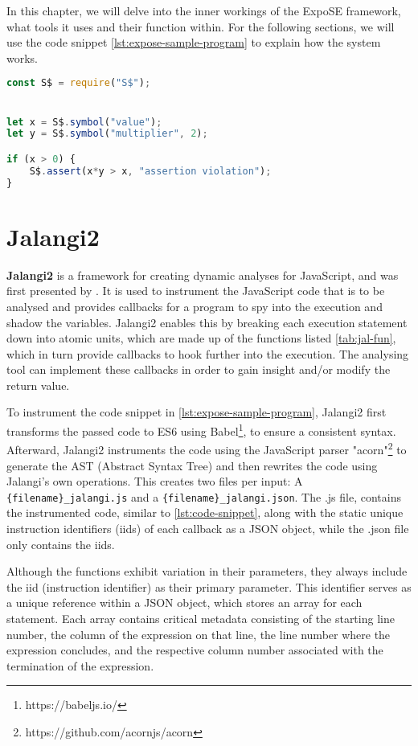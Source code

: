 \raggedbottom
In this chapter, we will delve into the inner workings of the ExpoSE framework, what tools it uses and their function within. 
For the following sections, we will use the code snippet \autoref{lst:expose-sample-program} to explain how the system works. 


\begin{lstlisting}[language=JavaScript,float, caption={A simple program for ExpoSE}, label={lst:expose-sample-program}]
const S$ = require("S$");


let x = S$.symbol("value"); 
let y = S$.symbol("multiplier", 2);

if (x > 0) {
    S$.assert(x*y > x, "assertion violation"); 
}


\end{lstlisting}




\section{Jalangi2}
\label{sec:jalangi}
\textbf{Jalangi2} \cite{noauthor_samsungjalangi2_nodate} is a framework for creating dynamic analyses for JavaScript, and was first presented by \citet{sen_jalangi_2013}. It is used to instrument the JavaScript code that is to be analysed and provides callbacks for a program to spy into the execution and shadow the variables.
Jalangi2 enables this by breaking each execution statement down into atomic units, which are made up of the functions listed \autoref{tab:jal-fun}, which in turn provide callbacks to hook further into the execution.
The analysing tool can implement these callbacks in order to gain insight and/or modify the return value.


To instrument the code snippet in \autoref{lst:expose-sample-program}, Jalangi2 first transforms the passed code to ES6 using Babel\footnote{https://babeljs.io/}, to ensure a consistent syntax. 
Afterward, Jalangi2 instruments the code using the JavaScript parser "acorn"\footnote{https://github.com/acornjs/acorn} to generate the AST (Abstract Syntax Tree) and then rewrites the code using Jalangi's own operations. This creates two files per input: 
A \lstinline+{filename}_jalangi.js+ and a \lstinline+{filename}_jalangi.json+. The .js file, contains the instrumented code, similar to \autoref{lst:code-snippet}, along with the static unique instruction identifiers (iids) of each callback as a JSON object, while the .json file only contains the iids.

Although the functions exhibit variation in their parameters, they always include the iid (instruction identifier) as their primary parameter. This identifier serves as a unique reference within a JSON object, which stores an array for each statement. Each array contains critical metadata consisting of the starting line number, the column of the expression on that line, the line number where the expression concludes, and the respective column number associated with the termination of the expression.



